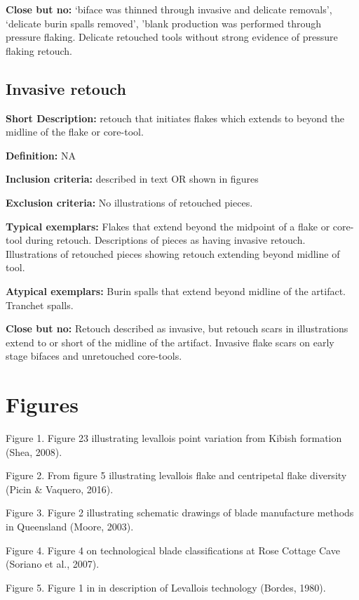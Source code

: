 \documentclass[
]{article}
\begin{document}
\textbf{Close but no:} `biface was thinned through invasive and delicate
removals', `delicate burin spalls removed', 'blank production was
performed through pressure flaking. Delicate retouched tools without
strong evidence of pressure flaking retouch.

\subsection{Invasive retouch}\label{invasive-retouch}

\textbf{Short Description:} retouch that initiates flakes which extends
to beyond the midline of the flake or core-tool.

\textbf{Definition:} NA

\textbf{Inclusion criteria:} described in text OR shown in figures

\textbf{Exclusion criteria:} No illustrations of retouched pieces.

\textbf{Typical exemplars:} Flakes that extend beyond the midpoint of a
flake or core-tool during retouch. Descriptions of pieces as having
invasive retouch. Illustrations of retouched pieces showing retouch
extending beyond midline of tool.

\textbf{Atypical exemplars:} Burin spalls that extend beyond midline of
the artifact. Tranchet spalls.

\textbf{Close but no:} Retouch described as invasive, but retouch scars
in illustrations extend to or short of the midline of the artifact.
Invasive flake scars on early stage bifaces and unretouched core-tools.

\section{Figures}\label{figures}

Figure 1. Figure 23 illustrating levallois point variation from Kibish
formation (Shea, 2008).

Figure 2. From figure 5 illustrating levallois flake and centripetal
flake diversity (Picin \& Vaquero, 2016).

Figure 3. Figure 2 illustrating schematic drawings of blade manufacture
methods in Queensland (Moore, 2003).

Figure 4. Figure 4 on technological blade classifications at Rose
Cottage Cave (Soriano et al., 2007).

Figure 5. Figure 1 in in description of Levallois technology (Bordes,
1980).
\end{document}
